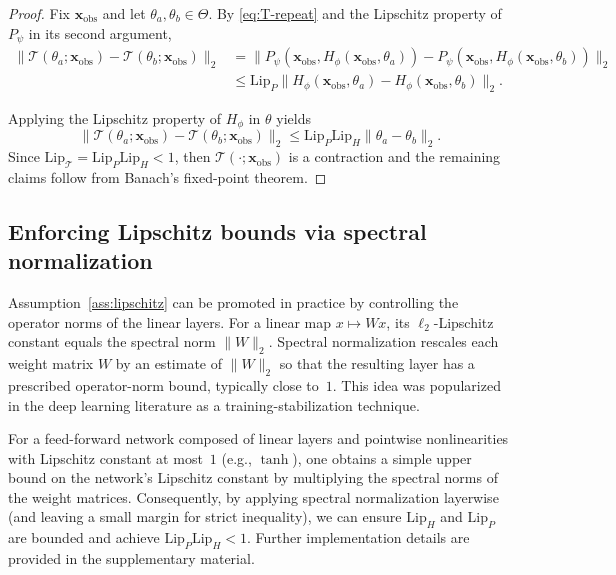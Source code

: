 \begin{proof}
    Fix $\mathbf{x}_\mathrm{obs}$ and let $\theta_a,\theta_b\in\Theta$.
    By \eqref{eq:T-repeat} and the Lipschitz property of $P_\psi$ in its second argument,
    \begin{align*}
        \lVert \mathcal{T}(\theta_a;\mathbf{x}_\mathrm{obs})-\mathcal{T}(\theta_b;\mathbf{x}_\mathrm{obs})\rVert_2
    &=
    \lVert P_\psi(\mathbf{x}_\mathrm{obs},H_\phi(\mathbf{x}_\mathrm{obs},\theta_a)) - P_\psi(\mathbf{x}_\mathrm{obs},H_\phi(\mathbf{x}_\mathrm{obs},\theta_b))\rVert_2
    \\
    &\le
    \mathrm{Lip}_P\lVert H_\phi(\mathbf{x}_\mathrm{obs},\theta_a)-H_\phi(\mathbf{x}_\mathrm{obs},\theta_b)\rVert_2.
    \end{align*}
    
    Applying the Lipschitz property of $H_\phi$ in $\theta$ yields
    $$
    \|\mathcal{T}(\theta_a;\mathbf{x}_\mathrm{obs})-\mathcal{T}(\theta_b;\mathbf{x}_\mathrm{obs})\|_2 \le \mathrm{Lip}_P\mathrm{Lip}_H\|\theta_a-\theta_b\|_2.
    $$
    Since $\mathrm{Lip}_\mathcal{T}=\mathrm{Lip}_P\mathrm{Lip}_H<1$, then $\mathcal{T}(\cdot;\mathbf{x}_\mathrm{obs})$ is a contraction and the remaining claims follow from Banach's fixed-point theorem.
\end{proof}

\subsection{Enforcing Lipschitz bounds via spectral normalization}
\label{subsec:sn}

Assumption~\ref{ass:lipschitz} can be promoted in practice by controlling the operator norms of the linear layers.
For a linear map $x\mapsto Wx$, its $\ell_2$-Lipschitz constant equals the spectral norm $\|W\|_2$.
Spectral normalization rescales each weight matrix $W$ by an estimate of $\|W\|_2$ so that the resulting layer has a prescribed operator-norm bound,
typically close to~$1$.
This idea was popularized in the deep learning literature as a training-stabilization technique. \cite{miyato2018spectralnormalizationgenerativeadversarial}

For a feed-forward network composed of linear layers and pointwise nonlinearities with Lipschitz constant at most~$1$ (e.g., $\tanh$),
one obtains a simple upper bound on the network's Lipschitz constant by multiplying the spectral norms of the weight matrices.
Consequently, by applying spectral normalization layerwise (and leaving a small margin for strict inequality),
we can ensure $\mathrm{Lip}_H$ and $\mathrm{Lip}_P$ are bounded and achieve $\mathrm{Lip}_P\mathrm{Lip}_H<1$.
Further implementation details are provided in the supplementary material.


